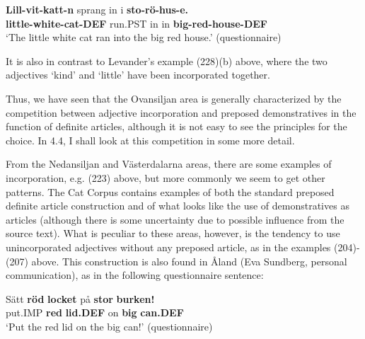 
\ea\label{}
\gll \textbf{Lill-vit-katt-n} sprang  in  i  \textbf{sto-rö-hus-e.}\\
\textbf{little-white-cat-DEF} run.PST  in  in  \textbf{big-red-house-DEF}\\
\glt ‘The little white cat ran into the big red house.’ (questionnaire)
\z

It is also in contrast to Levander’s example (228)(b) above, where the two adjectives  ‘kind’ and  ‘little’ have been incorporated together. 


Thus, we have seen that the Ovansiljan area is generally characterized by the competition between adjective incorporation and preposed demonstratives in the function of definite articles, although it is not easy to see the principles for the choice. In 4.4, I shall look at this competition in some more detail.


From the Nedansiljan and Västerdalarna areas, there are some examples of incorporation, e.g. (223) above, but more commonly we seem to get other patterns. The Cat Corpus contains examples of both the standard preposed definite article construction and of what looks like the use of demonstratives as articles (although there is some uncertainty due to possible influence from the source text). What is peculiar to these areas, however, is the tendency to use unincorporated adjectives without any preposed article, as in the examples (204){}-(207) above. This construction is also found in Åland (Eva Sundberg, personal communication), as in the following questionnaire sentence:


\ea\label{}
\gll Sätt  \textbf{röd} \textbf{locket} på  \textbf{stor} \textbf{burken!}\\
put.IMP  \textbf{red} \textbf{lid.DEF} on  \textbf{big} \textbf{can.DEF}\\
\glt ‘Put the red lid on the big can!’ (questionnaire)
\z

